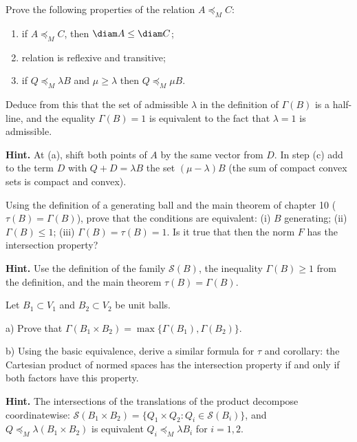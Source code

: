 \documentclass[a4paper,12pt]{report}
\begin{document}
\begin{task}
Prove the following properties of the relation $A\preceq_M C$\textup{:}
\begin{enumerate}
\item[(a)] if $A\preceq_M C$, then $\diam A\le\diam C$\textup{;}
\item[(b)] relation is reflexive and transitive\textup{;}
\item[(c)] if $Q\preceq_M\lambda B$ and $\mu\ge\lambda$ then $Q\preceq_M\mu B$.
\end{enumerate}
Deduce from this that the set of admissible $\lambda$ in the definition of $\Gamma(B)$ is a half-line, and the equality $\Gamma(B)=1$ is equivalent to the fact that $\lambda=1$ is admissible.

\textbf{Hint.} At \textup{(a)}, shift both points of $A$ by the same vector from $D$. In step \textup{(c)} add to the term $D$ with $Q+D=\lambda B$ the set $(\mu-\lambda)B$ (the sum of compact convex sets is compact and convex).
\end{task}

\begin{task}
Using the definition of a generating ball and the main theorem of chapter \textup{10} ($\tau(B)=\Gamma(B)$), prove that the conditions are equivalent\textup{:} \textup{(i)} $B$ generating\textup{;} \textup{(ii)} $\Gamma(B)\le1$\textup{;} \textup{(iii)} $\Gamma(B)=\tau(B)=1$. Is it true that then the norm $F$ has the intersection property?

\textbf{Hint.} Use the definition of the family $\mathcal S(B)$, the inequality $\Gamma(B)\ge1$ from the definition, and the main theorem $\tau(B)=\Gamma(B)$.
\end{task}

\begin{task}
Let $B_1\subset V_1$ and $B_2\subset V_2$ be unit balls.

\textup{a)} Prove that $\Gamma(B_1\times B_2)=\max\{\Gamma(B_1),\Gamma(B_2)\}$.

\textup{b)} Using the basic equivalence, derive a similar formula for $\tau$ and corollary\textup{:} the Cartesian product of normed spaces has the intersection property if and only if both factors have this property.

\textbf{Hint.} The intersections of the translations of the product decompose coordinatewise\textup{:} $\mathcal S(B_1\times B_2)=\{Q_1\times Q_2: Q_i\in\mathcal S(B_i)\}$, and $Q\preceq_M\lambda(B_1\times B_2)$ is equivalent $Q_i\preceq_M\lambda B_i$ for $i=1,2$.
\end{task}
\end{document}
